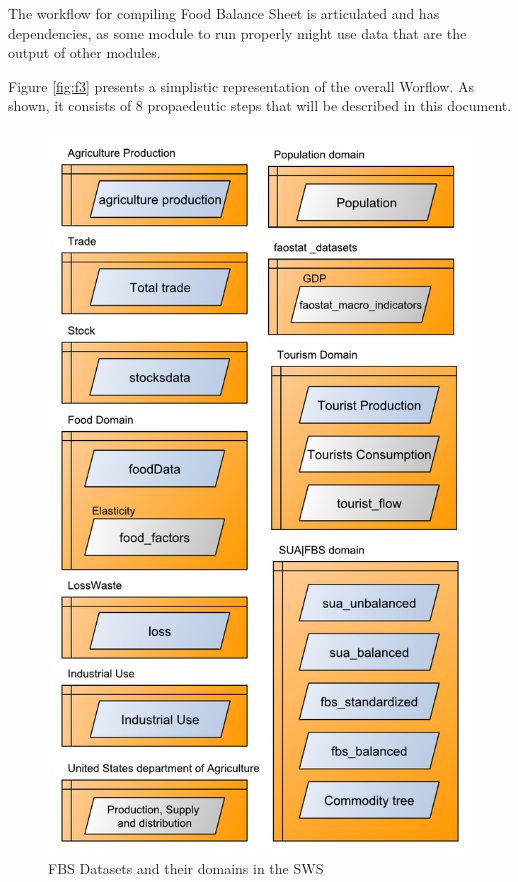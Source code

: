 \documentclass[]{article}
\begin{document}
The workflow for compiling Food Balance Sheet is articulated and has
dependencies, as some module to run properly might use data that are the
output of other modules.

Figure \ref{fig:f3} presents a simplistic representation of the overall
Worflow. As shown, it consists of 8 propaedeutic steps that will be
described in this document.

\begin{figure}[H]

{\centering \includegraphics[width=0.9\linewidth]{images/SwsFbs/02_DatasetsDomains} 

}

\caption{\label{fig:f2}FBS Datasets and their domains in the SWS}\label{fig:f2}
\end{figure}
\end{document}
